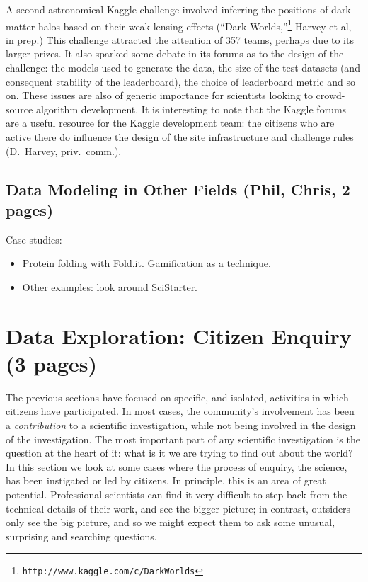 \documentclass{ar2e}
\begin{document}
A second astronomical Kaggle challenge involved inferring the positions of
dark matter halos based on their weak lensing effects (``Dark
Worlds,''\footnote{\texttt{http://www.kaggle.com/c/DarkWorlds}} Harvey et al,
in prep.) This challenge attracted the attention of 357 teams, perhaps due to
its larger prizes. It also sparked some debate in its forums as to the design
of the challenge: the models used to generate the data, the size of the test
datasets (and consequent stability of the leaderboard),  the choice of
leaderboard metric and so on. These issues are also of generic importance for
scientists looking to crowd-source algorithm development. It is interesting to
note that the Kaggle forums are a useful resource for the Kaggle development
team: the citizens who are active there do influence the design of the site
infrastructure and challenge rules (D.~Harvey, priv.~comm.).



\subsection{Data Modeling in Other Fields (\textbf{Phil}, Chris, 2 pages)}
\label{sec:model:astro}

Case studies:
\begin{itemize}
\item Protein folding with Fold.it. Gamification as a technique.
\item Other examples: look around SciStarter. 
\end{itemize}




\section{Data Exploration: Citizen Enquiry (3 pages)}
\label{sec:explore}

The previous sections have focused on specific, and isolated, activities in
which citizens have participated. In most cases, the community's involvement has
been a {\it contribution} to a scientific investigation, while not being
involved in the design of the investigation. The most important part of any
scientific investigation is the question at the heart of it: what is it we are
trying to find out about the world? In this section we look at some cases where
the process of enquiry, the science, has been instigated or led by citizens.  In
principle, this is an area of great potential. Professional scientists can find
it very difficult to step back from the technical details of their work, and see
the bigger picture; in contrast, outsiders only see the big picture, and  so we
might expect them to ask some unusual, surprising and searching questions. 
\end{document}
